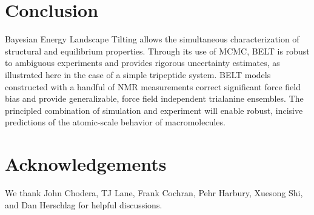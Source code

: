 \documentclass[11pt,titlepage]{article}
\begin{document}
\section*{Conclusion}

Bayesian Energy Landscape Tilting allows the simultaneous characterization of structural and equilibrium properties.  Through its use of MCMC, BELT is robust to ambiguous experiments and provides rigorous uncertainty estimates, as illustrated here in the case of a simple tripeptide system.  BELT models constructed with a handful of NMR measurements correct significant force field bias and provide generalizable, force field independent trialanine ensembles.  The principled combination of simulation and experiment will enable robust, incisive predictions of the atomic-scale behavior of macromolecules.  


\section*{Acknowledgements}

We thank John Chodera, TJ Lane, Frank Cochran, Pehr Harbury, Xuesong Shi, and Dan Herschlag for helpful discussions.  


\end{document}
